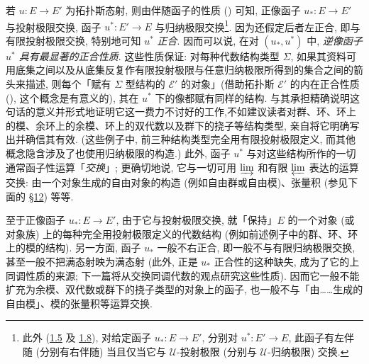 \subsubsection{}
若 $u:E\rightarrow E'$ 为拓扑斯态射, 则由伴随函子的性质 () 可知, 正像函子 $u_{\ast}:E\rightarrow E'$ 与投射极限交换, 函子 $u^{\ast}:E'\rightarrow E$ 与归纳极限交换\footnote[2]{此外 (\hyperref[IV.cor1.5]{1.5} 及 \hyperref[IV.rem1.8]{1.8}), 对给定函子 $u_{\ast}:E\rightarrow E'$, 分别对 $u^{\ast}:E'\rightarrow E$, 此函子有左伴随 (分别有右伴随) 当且仅当它与 $𝒰$-投射极限 (分别与 $𝒰$-归纳极限) 交换.}\label{sga4[1]}. 因为还假定后者左正合, 即与有限投射极限交换, 特别地可知 $u^{\ast}$ \emph{正合}. 因而可以说, 在对 $(u_{\ast},u^{\ast})$ 中, \emph{逆像函子 $u^{\ast}$ 具有最显著的正合性质}. 这些性质保证: 对每种代数结构类型 $\Sigma$, 如果其资料可用底集之间以及从底集反复作有限投射极限与任意归纳极限所得到的集合之间的箭头来描述, 则每个「赋有 $\Sigma$ 型结构的 $ℰ'$ 的对象」(借助拓扑斯 $ℰ'$ 的内在正合性质 (), 这个概念是有意义的), 其在 $u^{\ast}$ 下的像都赋有同样的结构. 与其承担精确说明这句话的意义并形式地证明它这一费力不讨好的工作,\pageoriginale 不如建议读者对群、环、环上的模、余环上的余模、环上的双代数以及群下的挠子等结构类型, 亲自将它明确写出并确信其有效. (这些例子中, 前三种结构类型完全用有限投射极限定义, 而其他概念隐含涉及了也使用归纳极限的构造.) 此外, 函子 $u^{\ast}$ 与对这些结构所作的一切通常函子性运算「\emph{交换}」; 更确切地说, 它与一切可用 $\varinjlim$ 和有限 $\varprojlim$ 表达的运算交换: 由一个对象生成的自由对象的构造 (例如自由群或自由模)、张量积 (参见下面的 \hyperref[IV.sec12]{\S 12}) 等等.

至于正像函子 $u_{\ast}:E\rightarrow E'$, 由于它与投射极限交换, 就「保持」$E$ 的一个对象 (或对象族) 上的每种完全用投射极限定义的代数结构 (例如前述例子中的群、环、环上的模的结构). 另一方面, 函子 $u_{\ast}$ 一般不右正合, 即一般不与有限归纳极限交换, 甚至一般不把满态射映为满态射 (此外, 正是 $u_{\ast}$ 正合性的这种缺失, 成为了它的上同调性质的来源; 下一篇将从交换同调代数的观点研究这些性质). 因而它一般不能扩充为余模、\pageoriginale 双代数或群下的挠子类型的对象上的函子, 也一般不与「由……生成的自由模」、模的张量积等运算交换.

